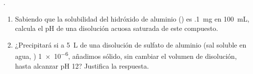 .\begin{enumerate}
	\item Sabiendo que la solubilidad del hidróxido de aluminio () es \SI{,1}{\milli\gram} en \SI{100}{\milli\liter}, calcula el pH de una disolución acuosa saturada de este compuesto.
	\item ¿Precipitará  si a \SI{5}{\liter} de una disolución de sulfato de aluminio (sal soluble en agua, ) \SI{1e-6}{\Molar}, añadimos  sólido, sin cambiar el volumen de disolución, hasta alcanzar pH \num{12}? Justifica la respuesta.
\end{enumerate}
